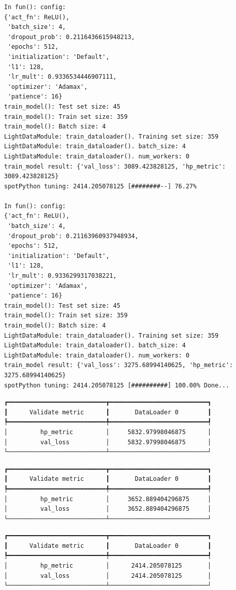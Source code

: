 \documentclass[
  letterpaper,
  DIV=11,
  numbers=noendperiod]{scrreprt}
\begin{document}
\begin{verbatim}
In fun(): config:
{'act_fn': ReLU(),
 'batch_size': 4,
 'dropout_prob': 0.2116436615948213,
 'epochs': 512,
 'initialization': 'Default',
 'l1': 128,
 'lr_mult': 0.9336534446907111,
 'optimizer': 'Adamax',
 'patience': 16}
train_model(): Test set size: 45
train_model(): Train set size: 359
train_model(): Batch size: 4
LightDataModule: train_dataloader(). Training set size: 359
LightDataModule: train_dataloader(). batch_size: 4
LightDataModule: train_dataloader(). num_workers: 0
train_model result: {'val_loss': 3089.423828125, 'hp_metric': 3089.423828125}
spotPython tuning: 2414.205078125 [########--] 76.27% 

In fun(): config:
{'act_fn': ReLU(),
 'batch_size': 4,
 'dropout_prob': 0.21163960937948934,
 'epochs': 512,
 'initialization': 'Default',
 'l1': 128,
 'lr_mult': 0.9336299317038221,
 'optimizer': 'Adamax',
 'patience': 16}
train_model(): Test set size: 45
train_model(): Train set size: 359
train_model(): Batch size: 4
LightDataModule: train_dataloader(). Training set size: 359
LightDataModule: train_dataloader(). batch_size: 4
LightDataModule: train_dataloader(). num_workers: 0
train_model result: {'val_loss': 3275.68994140625, 'hp_metric': 3275.68994140625}
spotPython tuning: 2414.205078125 [##########] 100.00% Done...
\end{verbatim}

\begin{verbatim}
┏━━━━━━━━━━━━━━━━━━━━━━━━━━━┳━━━━━━━━━━━━━━━━━━━━━━━━━━━┓
┃      Validate metric      ┃       DataLoader 0        ┃
┡━━━━━━━━━━━━━━━━━━━━━━━━━━━╇━━━━━━━━━━━━━━━━━━━━━━━━━━━┩
│         hp_metric         │     5832.97998046875      │
│         val_loss          │     5832.97998046875      │
└───────────────────────────┴───────────────────────────┘
\end{verbatim}

\begin{verbatim}
┏━━━━━━━━━━━━━━━━━━━━━━━━━━━┳━━━━━━━━━━━━━━━━━━━━━━━━━━━┓
┃      Validate metric      ┃       DataLoader 0        ┃
┡━━━━━━━━━━━━━━━━━━━━━━━━━━━╇━━━━━━━━━━━━━━━━━━━━━━━━━━━┩
│         hp_metric         │     3652.889404296875     │
│         val_loss          │     3652.889404296875     │
└───────────────────────────┴───────────────────────────┘
\end{verbatim}

\begin{verbatim}
┏━━━━━━━━━━━━━━━━━━━━━━━━━━━┳━━━━━━━━━━━━━━━━━━━━━━━━━━━┓
┃      Validate metric      ┃       DataLoader 0        ┃
┡━━━━━━━━━━━━━━━━━━━━━━━━━━━╇━━━━━━━━━━━━━━━━━━━━━━━━━━━┩
│         hp_metric         │      2414.205078125       │
│         val_loss          │      2414.205078125       │
└───────────────────────────┴───────────────────────────┘
\end{verbatim}
\end{document}
